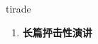 
\begin{frame}
{\huge tirade}
\begin{center}
\begin{enumerate}\Large
  \item \textbf{长篇抨击性演讲}
\end{enumerate}
\end{center}
\end{frame}
